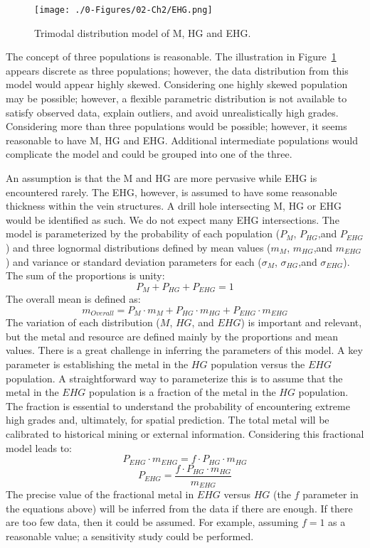 \begin{figure}[htb!]
    \centering
    \texttt{[image: ./0-Figures/02-Ch2/EHG.png]}
    \caption{Trimodal distribution model of \acrfull{M}, \acrfull{HG} and \acrfull{EHG}.}
    \label{fig:ehg}
\end{figure}


The concept of three populations is reasonable. The illustration in Figure~\ref{fig:ehg} appears discrete as three populations; however, the data distribution from this model would appear highly skewed. Considering one highly skewed population may be possible; however, a flexible parametric distribution is not available to satisfy observed data, explain outliers, and avoid unrealistically high grades. Considering more than three populations would be possible; however, it seems reasonable to have \gls{M}, \gls{HG} and \gls{EHG}. Additional intermediate populations would complicate the model and could be grouped into one of the three.

An assumption is that the \gls{M} and \gls{HG} are more pervasive while \gls{EHG} is encountered rarely. The \gls{EHG}, however, is assumed to have some reasonable thickness within the vein structures. A drill hole intersecting \gls{M}, \gls{HG} or \gls{EHG} would be identified as such. We do not expect many \gls{EHG} intersections. The model is parameterized by the probability of each population ($P_{M}$, $P_{HG}$,and $P_{EHG}$) and three lognormal distributions defined by mean values ($m_{M}$, $m_{HG}$,and $m_{EHG}$) and variance or standard deviation parameters for each ($\sigma_{M}$, $\sigma_{HG}$,and $\sigma_{EHG}$).  The sum of the proportions is unity:
\[
    P_{M} + P_{HG} + P_{EHG}= 1
\]
The overall mean is defined as:
\[
    m_{Overall} = P_{M} \cdot m_{M}  + P_{HG} \cdot m_{HG} + P_{EHG} \cdot m_{EHG}
\]
The variation of each distribution ($M$, $HG$, and $EHG$) is important and relevant, but the metal and resource are defined mainly by the proportions and mean values. There is a great challenge in inferring the parameters of this model. A key parameter is establishing the metal in the $HG$ population versus the $EHG$ population. A straightforward way to parameterize this is to assume that the metal in the $EHG$ population is a fraction of the metal in the $HG$ population. The fraction is essential to understand the probability of encountering extreme high grades and, ultimately, for spatial prediction. The total metal will be calibrated to historical mining or external information. Considering this fractional model leads to:
\[
    P_{EHG} \cdot m_{EHG} = f \cdot P_{HG} \cdot m_{HG}
\]
\[
    P_{EHG} = \frac{f \cdot P_{HG} \cdot m_{HG}}{m_{EHG}}
\]
The precise value of the fractional metal in $EHG$ versus $HG$ (the $f$ parameter in the equations above) will be inferred from the data if there are enough. If there are too few data, then it could be assumed. For example, assuming $f=1$ as a reasonable value; a sensitivity study could be performed.

